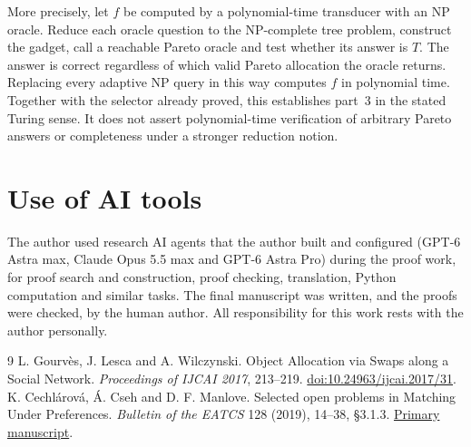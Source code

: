 \documentclass[11pt]{article}
\begin{document}
More precisely, let $f$ be computed by a polynomial-time transducer
with an NP oracle. Reduce each oracle question to the NP-complete tree
problem, construct the gadget, call a reachable Pareto oracle and test
whether its answer is $T$. The answer is correct regardless of which
valid Pareto allocation the oracle returns. Replacing every adaptive NP
query in this way computes $f$ in polynomial time. Together with the
selector already proved, this establishes part~3 in the stated Turing
sense. It does not assert polynomial-time verification of arbitrary
Pareto answers or completeness under a stronger reduction notion.

\section*{Use of AI tools}
The author used research AI agents that the author built and configured (GPT-6 Astra max,
Claude Opus 5.5 max and GPT-6 Astra Pro) during the proof work, for proof search and
construction, proof checking, translation, Python computation and similar tasks. The final
manuscript was written, and the proofs were checked, by the human author. All responsibility
for this work rests with the author personally.

\begin{thebibliography}{9}
L. Gourv\`es, J. Lesca and A. Wilczynski.
Object Allocation via Swaps along a Social Network.
\emph{Proceedings of IJCAI 2017}, 213--219.
\href{https://doi.org/10.24963/ijcai.2017/31}{doi:10.24963/ijcai.2017/31}.
K. Cechl\'arov\'a, \'A. Cseh and D. F. Manlove.
Selected open problems in Matching Under Preferences.
\emph{Bulletin of the EATCS} 128 (2019), 14--38, \S3.1.3.
\href{https://hpi.de/friedrich/docs/publications/2019/BEATCS.pdf}{Primary manuscript}.
\end{thebibliography}
\end{document}

